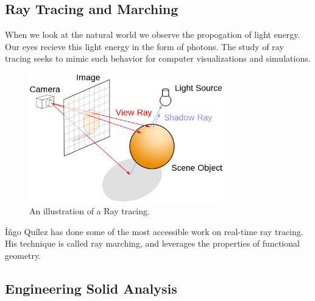 \subsection{Ray Tracing and Marching}


When we look at the natural world we observe the
propogation of light energy. Our eyes recieve this light energy in the form
of photons. The study of ray tracing seeks to mimic such behavior for
computer visualizations and simulations. 

\begin{figure}[h!]
  \centering
    \includegraphics[width=0.75\textwidth]{img/ray_trace_diagram.png}
  \caption{An illustration of a Ray tracing.\protect\footnotemark}
  \label{fig:raytrace}
\end{figure}


Íñgo Quílez has done some of the most accessible work on real-time ray tracing.
His technique is called ray marching, and leverages the properties of functional
geometry.\cite{Quilez_2008}

\subsection{Engineering Solid Analysis}



